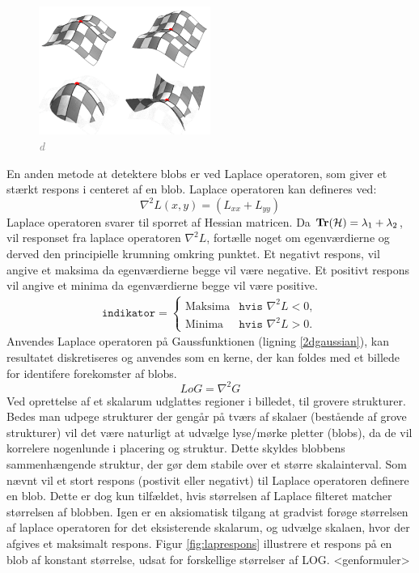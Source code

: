 \begin{figure}[H]
    \centering
    \includegraphics[width=0.50\textwidth]{fig/41.png}
    \vspace{-0.5em}
    \begin{center}
    \caption{\textcolor{gray}{\footnotesize \textit{
d   }}}
    \label{fig:makssad}
     \end{center}
  \end{figure}
       \vspace{-2.7em}
\noindent
En anden metode at detektere blobs er ved Laplace operatoren, som giver et stærkt respons i centeret af en blob. Laplace operatoren kan defineres ved:
$$
\nabla^2L(x,y) = (L_{xx}+L_{yy})
$$
Laplace operatoren svarer til sporret af Hessian matricen. Da $\bold{Tr}(\mathcal{H}) = \lambda_1 + \lambda_2$, vil responset fra laplace operatoren $\nabla^2L$, fortælle noget om egenværdierne og derved den principielle krumning omkring punktet. Et negativt respons, vil angive et maksima da egenværdierne begge vil være negative. Et positivt respons vil angive et minima da egenværdierne begge vil være positive.
\begin{equation}
\begin{split}
\texttt{indikator} = 
\begin{cases}
\text{Maksima}& \texttt{hvis } \nabla^2L < 0,  \\
\text{Minima} & \texttt{hvis } \nabla^2L > 0.
\end{cases}
\end{split}
\label{detman}
\end{equation}
Anvendes Laplace operatoren på Gaussfunktionen (ligning \eqref{2dgaussian}), kan resultatet diskretiseres og anvendes som en kerne, der kan foldes med et billede for identifere forekomster af blobs.
\begin{equation}
LoG= \nabla^2 G
\label{lap}
\end{equation}
Ved oprettelse af et skalarum udglattes regioner i billedet, til grovere strukturer. Bedes man udpege strukturer der gengår på tværs af skalaer (bestående af grove strukturer) vil det være naturligt at udvælge lyse/mørke pletter (blobs), da de vil korrelere nogenlunde i placering og struktur. Dette skyldes blobbens sammenhængende struktur, der gør dem stabile over et større skalainterval. Som nævnt vil et stort respons (postivit eller negativt) til Laplace operatoren definere en blob. Dette er dog kun tilfældet, hvis størrelsen af Laplace filteret matcher størrelsen af blobben. Igen er en aksiomatisk tilgang at gradvist forøge størrelsen af laplace operatoren for det eksisterende skalarum, og udvælge skalaen, hvor der afgives et maksimalt respons. Figur \ref{fig:laprespons} illustrere et respons på en blob af konstant størrelse, udsat for forskellige størrelser af LOG. <genformuler>
